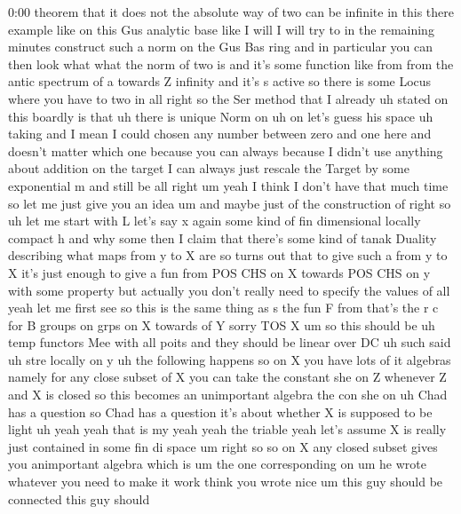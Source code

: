 \begin{unfinished}{0:00}
theorem  that
it  does  not  the  absolute  way  of  two  can
be  infinite  in  this  there  example  like
on  this  Gus  analytic
base  like  I
will  I  will  try  to  in  the  remaining
minutes
construct  such  a  norm  on  the  Gus  Bas
ring  and  in  particular  you  can  then  look
what  what  the  norm  of  two  is  and  it's
some  function  like  from  from  the  antic
spectrum  of  a  towards  Z  infinity  and
it's  s
active
so  there  is  some  Locus  where  you  have  to
two
in  all  right  so  the  Ser
method  that  I  already  uh
stated  on  this
boardly  is  that  uh  there  is
unique  Norm  on  uh  on  let's  guess  his
space
uh
taking  and  I  mean  I  could  chosen  any
number  between  zero  and  one  here  and
doesn't  matter  which  one  because  you  can
always  because  I  didn't  use  anything
about  addition  on  the  target  I  can
always  just  rescale  the  Target  by  some
exponential  m  and  still
be  all  right  um
yeah  I  think  I  don't  have  that  much  time
so  let  me  just  give  you  an
idea  um  and  maybe  just  of  the
construction
of
right
so
uh  let  me  start  with
L  let's  say  x  again  some  kind  of  fin
dimensional  locally  compact
h
and  why
some  then  I  claim  that  there's  some  kind
of  tanak  Duality  describing  what  maps
from  y  to  X
are  so  turns  out  that  to  give  such  a
from  y  to  X  it's  just  enough  to  give  a
fun  from  POS  CHS  on  X  towards  POS  CHS  on
y  with  some
property  but  actually  you  don't  really
need  to  specify  the  values  of
all  yeah  let  me  first  see  so  this  is  the
same  thing  as  s  the
fun  F
from
that's  the  r  c  for  B  groups
on  grps  on  X
towards  of  Y  sorry  TOS
X  um  so  this  should
be  uh  temp
functors
Mee  with  all
poits  and  they  should  be  linear  over
DC  uh  such
said  uh  stre  locally  on
y
uh  the  following  happens  so  on
X  you  have  lots  of  it
algebras  namely  for
any  close  subset  of  X  you  can
take  the  constant  she  on  Z  whenever  Z
and  X  is
closed  so  this  becomes  an  unimportant
algebra
the  con  she  on  uh  Chad  has  a  question  so
Chad  has  a  question  it's  about  whether  X
is  supposed  to  be
light
uh  yeah  yeah  that  is  my  yeah  yeah  the
triable
yeah  let's  assume  X  is  really  just
contained  in  some  fin  di
space  um
right  so  so  on  X  any  closed  subset  gives
you  animportant  algebra  which  is  um  the
one
corresponding  on  um  he  wrote  whatever
you  need  to  make  it
work  think  you  wrote
nice
um  this  guy  should  be
connected  this  guy  should

\end{unfinished}
